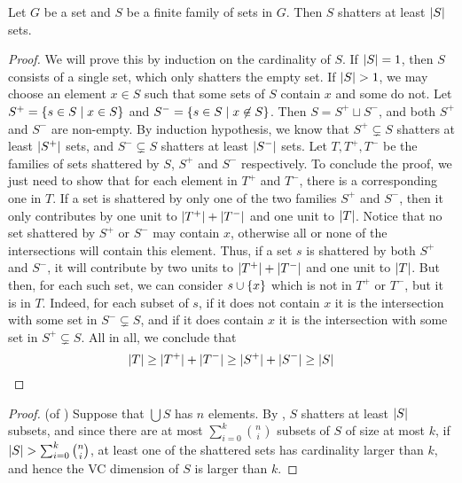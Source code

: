     \begin{lemma} \label{lem:pajor}
        Let $G$ be a set and $S$ be a finite family of sets in $G$.
        Then $S$ shatters at least $| S |$ sets.
        \begin{proof}
            We will prove this by induction on the cardinality of $S$.
            If $| S | = 1$, then $S$ consists of a single set, which only shatters the empty set.
            If $| S | > 1$, we may choose an element $x \in S$ such that some sets of $S$ contain $x$ and some do not.
            Let $S^+ = \{ s \in S \mid x \in S \}$ and $S^- = \{ s \in S \mid x \not\in S \}$.
            Then $S = S^+ \sqcup S^-$, and both $S^+$ and $S^-$ are non-empty.
            By induction hypothesis, we know that $S^+ \subsetneq S$ shatters at least $| S^+ |$ sets,
            and $S^- \subsetneq S$ shatters at least $| S^- |$ sets.
            Let $T, T^+, T^-$ be the families of sets shattered by $S$, $S^+$ and $S^-$ respectively.
            To conclude the proof, we just need to show that for each element in $T^+$ and $T^-$, there is a corresponding
            one in $T$.
            If a set is shattered by only one of the two families $S^+$ and $S^-$, then it only contributes by one unit
            to $| T^+ | + | T^- |$ and one unit to $| T |$.
            Notice that no set shattered by $S^+$ or $S^-$ may contain $x$, otherwise all or none of the intersections
            will contain this element.
            Thus, if a set $s$ is shattered by both $S^+$ and $S^-$, it will contribute by two units to
            $| T^+ | + | T^- |$ and one unit to $| T |$.
            But then, for each such set, we can consider $s \cup \{ x \}$ which is not in $T^+$ or $T^-$, but it is in $T$.
            Indeed, for each subset of $s$, if it does not contain $x$ it is the intersection with some
            set in $S^- \subsetneq S$, and if it does contain $x$ it is the intersection with some set in $S^+ \subsetneq S$.
            All in all, we conclude that
            \[
                | T | \geq | T^+ | + | T^- | \geq | S^+ | + | S^- |
                                \geq | S |
            \]
        \end{proof}
    \end{lemma}

    \begin{proof} (of )
        Suppose that $\bigcup S$ has $n$ elements.
        By , $S$ shatters at least $| S |$ subsets, and since there are at most
        $\sum_{i=0}^k \binom{n}{i}$ subsets of $S$ of size at most $k$, if
        $| S | > \sum_{i=0}^k \binom{n}{i}$, at least one of the shattered sets has cardinality larger than $k$,
        and hence the VC dimension of $S$ is larger than $k$.
    \end{proof}

